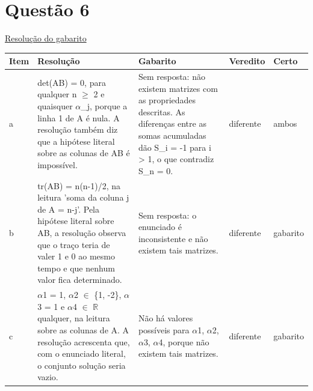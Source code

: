 \documentclass{article}%
\begin{document}
\section*{Questão 6}%
\href{https://poliedroresolve.sistemapoliedro.com.br/vestibulares/ita/2026/ita-2-fase-dia-1-28-10-2025-2-fase-dia-1/dissertativa-6-matematica-2-fase-dia-1-ita-2026}{Resolução do gabarito}\par\smallskip%
\begin{longtable}{@{}p{} p{} p{} p{} p{}@{}}\toprule Item & Resolução & Gabarito & Veredito & Certo \\ \midrule
a & det(AB) = 0, para qualquer n $\geq$ 2 e quaisquer $\alpha$\_j, porque a linha 1 de A é nula. A resolução também diz que a hipótese literal sobre as colunas de AB é impossível. & Sem resposta: não existem matrizes com as propriedades descritas. As diferenças entre as somas acumuladas dão S\_i = -1 para i > 1, o que contradiz S\_n = 0. & diferente & ambos \\
b & tr(AB) = n(n-1)/2, na leitura 'soma da coluna j de A = n-j'. Pela hipótese literal sobre AB, a resolução observa que o traço teria de valer 1 e 0 ao mesmo tempo e que nenhum valor fica determinado. & Sem resposta: o enunciado é inconsistente e não existem tais matrizes. & diferente & gabarito \\
c & $\alpha$1 = 1, $\alpha$2 $\in$ \{1, -2\}, $\alpha$3 = 1 e $\alpha$4 $\in$ $\mathbb{R}$ qualquer, na leitura sobre as colunas de A. A resolução acrescenta que, com o enunciado literal, o conjunto solução seria vazio. & Não há valores possíveis para $\alpha$1, $\alpha$2, $\alpha$3, $\alpha$4, porque não existem tais matrizes. & diferente & gabarito \\
\bottomrule\end{longtable}%
\end{document}
